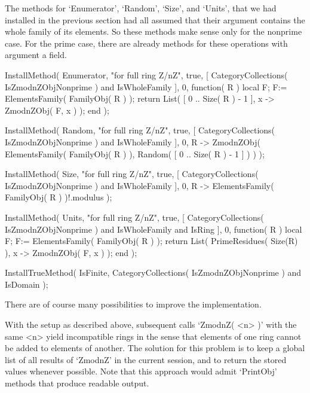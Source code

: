 The methods for `Enumerator', `Random', `Size', and `Units',
that we had installed in the previous section had all assumed that
their argument contains the whole family of its elements.
So these methods make sense only for the nonprime case.
For the prime case, there are already methods for these operations
with argument a field.

\begintt
    InstallMethod( Enumerator,
        "for full ring Z/nZ",
        true,
        [ CategoryCollections( IsZmodnZObjNonprime ) and IsWholeFamily ],
        0,
        function( R )
        local F;
        F:= ElementsFamily( FamilyObj( R ) );
        return List( [ 0 .. Size( R ) - 1 ], x -> ZmodnZObj( F, x ) );
        end );

    InstallMethod( Random,
        "for full ring Z/nZ",
        true,
        [ CategoryCollections( IsZmodnZObjNonprime ) and IsWholeFamily ],
        0,
        R -> ZmodnZObj( ElementsFamily( FamilyObj( R ) ),
                        Random( [ 0 .. Size( R ) - 1 ] ) ) );

    InstallMethod( Size,
        "for full ring Z/nZ",
        true,
        [ CategoryCollections( IsZmodnZObjNonprime ) and IsWholeFamily ],
        0,
        R -> ElementsFamily( FamilyObj( R ) )!.modulus );

    InstallMethod( Units,
        "for full ring Z/nZ",
        true,
        [     CategoryCollections( IsZmodnZObjNonprime )
          and IsWholeFamily and IsRing ],
        0,
        function( R )
        local F;
        F:= ElementsFamily( FamilyObj( R ) );
        return List( PrimeResidues( Size(R) ), x -> ZmodnZObj( F, x ) );
        end );

    InstallTrueMethod( IsFinite,
        CategoryCollections( IsZmodnZObjNonprime ) and IsDomain );
\endtt



There are of course many possibilities to improve the implementation.

With the setup as described above,
subsequent calls `ZmodnZ( <n> )' with the same <n> yield incompatible
rings in the sense that elements of one ring cannot be added to elements
of another.
The solution for this problem is to keep a global list of all results of
`ZmodnZ' in the current {\GAP} session, and to return the stored values
whenever possible.
Note that this approach would admit `PrintObj' methods that produce
{\GAP} readable output.

